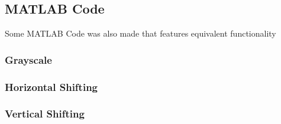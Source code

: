 \documentclass[10pt]{report}
\begin{document}
    \newpage

    \subsection{MATLAB Code}

    Some MATLAB Code was also made that features equivalent functionality

        \subsubsection{Grayscale}

        

        \subsubsection{Horizontal Shifting}

        

        \subsubsection{Vertical Shifting}

        
\end{document}

